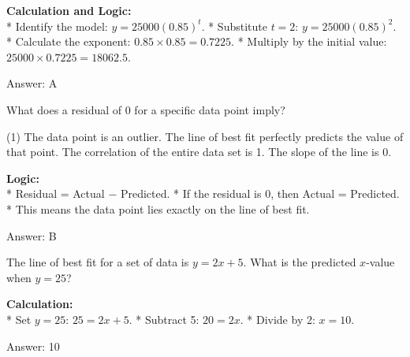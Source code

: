 \documentclass[11pt,paper=a4,answers]{exam}
\begin{document}
\begin{questions}
\begin{solution}
\textbf{Calculation and Logic:} \\
* Identify the model: $y = 25000(0.85)^t$.
* Substitute $t = 2$: $y = 25000(0.85)^2$.
* Calculate the exponent: $0.85 \times 0.85 = 0.7225$.
* Multiply by the initial value: $25000 \times 0.7225 = 18062.5$.

\vspace{30pt}

Answer: \colorbox{yellow!100}{A}
\end{solution}

\vspace{60pt}

\question
What does a residual of 0 for a specific data point imply?
\begin{tasks}(1)
    \task The data point is an outlier.
    \task The line of best fit perfectly predicts the value of that point.
    \task The correlation of the entire data set is 1.
    \task The slope of the line is 0.
\end{tasks}

\begin{solution}
\textbf{Logic:} \\
* Residual = Actual $-$ Predicted.
* If the residual is 0, then Actual = Predicted.
* This means the data point lies exactly on the line of best fit.

\vspace{30pt}

Answer: \colorbox{yellow!100}{B}
\end{solution}

\vspace{60pt}

\question
The line of best fit for a set of data is $y = 2x + 5$. What is the predicted $x$-value when $y = 25$?

\begin{solution}
\textbf{Calculation:} \\
* Set $y = 25$: $25 = 2x + 5$.
* Subtract 5: $20 = 2x$.
* Divide by 2: $x = 10$.

\vspace{30pt}

Answer: \colorbox{yellow!100}{10}
\end{solution}

\vspace{60pt}


\end{questions}
\end{document}
